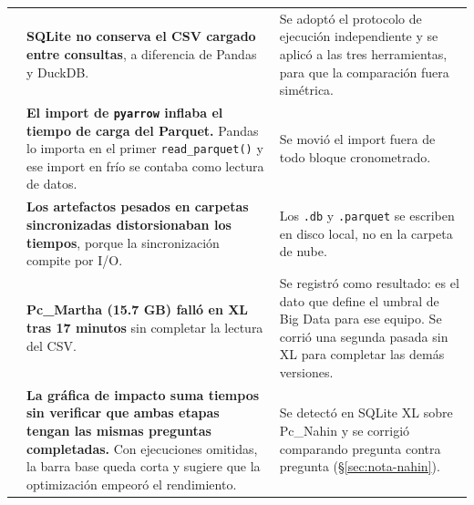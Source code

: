 {\begin{longtable}{>{\raggedright\arraybackslash}p{0.4cm}>{\raggedright\arraybackslash}p{7.9cm}>{\raggedright\arraybackslash}p{7.9cm}}
5 & \textbf{SQLite no conserva el CSV cargado entre consultas}, a diferencia de Pandas y DuckDB. &
Se adoptó el protocolo de ejecución independiente y se aplicó a las tres herramientas, para que la comparación fuera simétrica. \\
6 & \textbf{El import de \texttt{pyarrow} inflaba el tiempo de carga del Parquet.} Pandas lo importa en el primer \texttt{read\_parquet()} y ese import en frío se contaba como lectura de datos. &
Se movió el import fuera de todo bloque cronometrado. \\
7 & \textbf{Los artefactos pesados en carpetas sincronizadas distorsionaban los tiempos}, porque la sincronización compite por I/O. &
Los \texttt{.db} y \texttt{.parquet} se escriben en disco local, no en la carpeta de nube. \\
8 & \textbf{Pc\_Martha (15.7 GB) falló en XL tras 17 minutos} sin completar la lectura del CSV. &
Se registró como resultado: es el dato que define el umbral de Big Data para ese equipo. Se corrió una segunda pasada sin XL para completar las demás versiones. \\
9 & \textbf{La gráfica de impacto suma tiempos sin verificar que ambas etapas tengan las mismas preguntas completadas.} Con ejecuciones omitidas, la barra base queda corta y sugiere que la optimización empeoró el rendimiento. &
Se detectó en SQLite XL sobre Pc\_Nahin y se corrigió comparando pregunta contra pregunta (\S\ref{sec:nota-nahin}). \\
\end{longtable}
}
